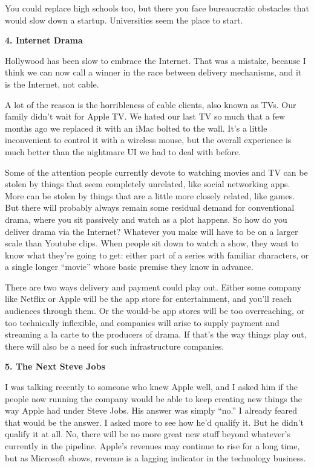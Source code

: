 You could replace high schools too, but there you face bureaucratic
obstacles that would slow down a startup. Universities seem the place to
start.

\textbf{4. Internet Drama}

Hollywood has been slow to embrace the Internet. That was a mistake,
because I think we can now call a winner in the race between delivery
mechanisms, and it is the Internet, not cable.

A lot of the reason is the horribleness of cable clients, also known as
TVs. Our family didn't wait for Apple TV. We hated our last TV so much
that a few months ago we replaced it with an iMac bolted to the wall.
It's a little inconvenient to control it with a wireless mouse, but the
overall experience is much better than the nightmare UI we had to deal
with before.

Some of the attention people currently devote to watching movies and TV
can be stolen by things that seem completely unrelated, like social
networking apps. More can be stolen by things that are a little more
closely related, like games. But there will probably always remain some
residual demand for conventional drama, where you sit passively and
watch as a plot happens. So how do you deliver drama via the Internet?
Whatever you make will have to be on a larger scale than Youtube clips.
When people sit down to watch a show, they want to know what they're
going to get: either part of a series with familiar characters, or a
single longer ``movie'' whose basic premise they know in advance.

There are two ways delivery and payment could play out. Either some
company like Netflix or Apple will be the app store for entertainment,
and you'll reach audiences through them. Or the would-be app stores will
be too overreaching, or too technically inflexible, and companies will
arise to supply payment and streaming a la carte to the producers of
drama. If that's the way things play out, there will also be a need for
such infrastructure companies.

\textbf{5. The Next Steve Jobs}

I was talking recently to someone who knew Apple well, and I asked him
if the people now running the company would be able to keep creating new
things the way Apple had under Steve Jobs. His answer was simply ``no.''
I already feared that would be the answer. I asked more to see how he'd
qualify it. But he didn't qualify it at all. No, there will be no more
great new stuff beyond whatever's currently in the pipeline. Apple's
revenues may continue to rise for a long time, but as Microsoft shows,
revenue is a lagging indicator in the technology business.

